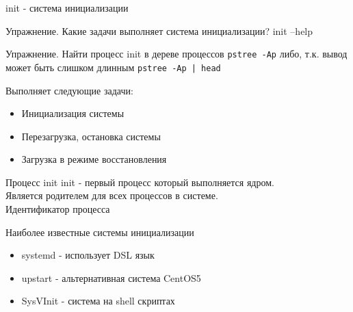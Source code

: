 \begin{frame}{init - система инициализации}


\begin{block}{Упражнение. Какие задачи выполняет система инициализации?}
init --help
\end{block}

\begin{block}{Упражнение. Найти процесс init в дереве процессов}
{\tt pstree -Ap}
либо, т.к. вывод может быть слишком длинным
{\tt pstree -Ap | head}
\end{block}

\pause
 Выполняет следующие задачи:
\begin{itemize}
    \item Инициализация системы
    \item Перезагрузка, остановка системы
    \item Загрузка в режиме восстановления 
\end{itemize}
\end{frame}

\begin{frame}{Процесс init}
\alert{init} - первый процесс который выполняется ядром. \\
        Является родителем для всех процессов в системе. \\
        Идентификатор процесса

	\begin{block}{Наиболее известные системы инициализации}
		\begin{itemize}
			\item systemd - использует DSL язык
			\item upstart - альтернативная система CentOS5 
			\item SysVInit - система на shell скриптах
		\end{itemize}
	\end{block}
    
\end{frame}


